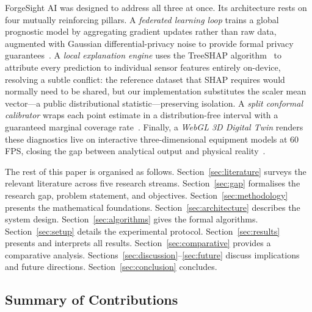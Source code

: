 \documentclass[10pt, journal, letterpaper]{IEEEtran}
\begin{document}
ForgeSight AI was designed to address all three at once. Its architecture
rests on four mutually reinforcing pillars. A \textit{federated learning loop}
trains a global prognostic model by aggregating gradient updates rather than
raw data, augmented with Gaussian differential-privacy noise to provide formal
privacy guarantees~\cite{mcmahan2017}. A \textit{local explanation engine}
uses the TreeSHAP algorithm~\cite{lundberg2017} to attribute every prediction
to individual sensor features entirely on-device, resolving a subtle conflict:
the reference dataset that SHAP requires would normally need to be shared, but
our implementation substitutes the scaler mean vector—a public distributional
statistic—preserving isolation. A \textit{split conformal calibrator} wraps
each point estimate in a distribution-free interval with a guaranteed
marginal coverage rate~\cite{vovk2008,angelopoulos2021}. Finally, a
\textit{WebGL 3D Digital Twin} renders these diagnostics live on interactive
three-dimensional equipment models at 60 FPS, closing the gap between
analytical output and physical reality~\cite{fuller2020,grieves2017}.

The rest of this paper is organised as follows. Section~\ref{sec:literature}
surveys the relevant literature across five research streams.
Section~\ref{sec:gap} formalises the research gap, problem statement, and
objectives. Section~\ref{sec:methodology} presents the mathematical
foundations. Section~\ref{sec:architecture} describes the system design.
Section~\ref{sec:algorithms} gives the formal algorithms.
Section~\ref{sec:setup} details the experimental protocol.
Section~\ref{sec:results} presents and interprets all results.
Section~\ref{sec:comparative} provides a comparative analysis.
Sections~\ref{sec:discussion}--\ref{sec:future} discuss implications and
future directions. Section~\ref{sec:conclusion} concludes.

\subsection{Summary of Contributions}
\end{document}
